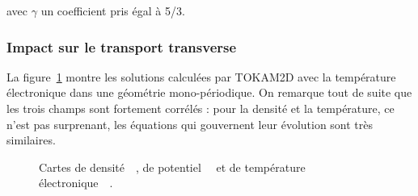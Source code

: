 \begin{refsection}

avec $\gamma$ un coefficient pris égal à 5/3. 
\subsubsection{Impact sur le transport transverse}

La figure~\ref{2-CartesWithTe} montre les solutions calculées par TOKAM2D avec
la température électronique dans une géométrie mono-périodique. On remarque tout
de suite que les trois champs sont fortement corrélés : pour la densité et
la température, ce n'est pas surprenant, les équations qui gouvernent leur
évolution sont très similaires. 
\begin{figure}[!htbp]
    \centering
    \caption{Cartes de densité~~, de
    potentiel~~ et de température 
    électronique~~.}
    \label{2-CartesWithTe}
	\end{figure}
	

\end{refsection}
